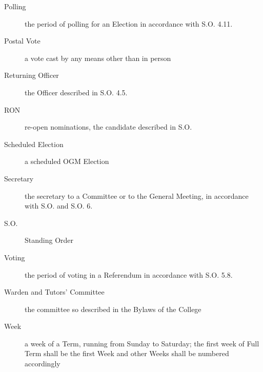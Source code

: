 \begin{description}
\item[Polling] the period of polling for an Election in accordance with S.O. 4.11.
\item[Postal Vote] a vote cast by any means other than in person
\item[Returning Officer] the Officer described in S.O. 4.5.
\item[RON] re-open nominations, the candidate described in S.O. \
\item[Scheduled Election] a scheduled OGM Election
\item[Secretary] the secretary to a Committee or to the General Meeting, in accordance with S.O. and S.O. 6.
\item[S.O.] Standing Order 
\item[Voting] the period of voting in a Referendum in accordance with S.O. 5.8.
\item[Warden and Tutors' Committee] the committee so described in the Bylaws of the College
\item[Week] a week of a Term, running from Sunday to Saturday; the first week of Full Term shall be the first Week and other Weeks shall be numbered accordingly

\end{description}